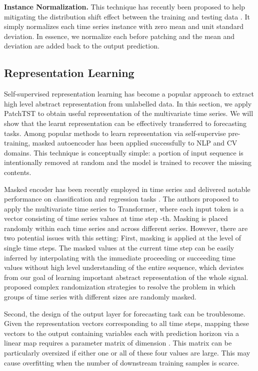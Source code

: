 \documentclass{article} \usepackage{iclr2023_conference,times}
\begin{document}
\textbf{Instance Normalization.} This technique has recently been proposed to help mitigating the distribution shift effect between the training and testing data \citep{instance,revin}. It simply normalizes each time series instance  with zero mean and unit standard deviation. In essence, we normalize each  before patching and the mean and deviation are added back to the output prediction.   

\subsection{Representation Learning}
\label{subsec::representation learning}

Self-supervised representation learning has become a popular approach to extract high level abstract representation from unlabelled data. In this section, we apply PatchTST to obtain useful representation of the multivariate time series. We will show that the learnt representation can be effectively transferred to forecasting tasks. Among popular methods to learn representation via self-supervise pre-training, masked autoencoder has been applied successfully to NLP \citep{bert} and CV \citep{mae} domains. This technique is conceptually simple: a portion of input sequence is intentionally removed at random and the model is trained to recover the missing contents. 


Masked encoder has been recently employed in time series and delivered notable performance on classification and regression tasks \citep{tst}. The authors proposed to apply the multivariate time series to Transformer, where each input token is a vector  consisting of time series values at time step -th. Masking is placed randomly within each time series and across different series. However, there are two potential issues with this setting: First, masking is applied at the level of single time steps. The masked values at the current time step can be easily inferred by interpolating with the immediate proceeding or succeeding time values without high level understanding of the entire sequence, which deviates from our goal of learning important abstract representation of the whole signal. \citet{tst} proposed complex randomization strategies to resolve the problem in which groups of time series with different sizes are randomly masked. 





Second, the design of the output layer for forecasting task can be troublesome. Given the representation vectors   corresponding to all  time steps, mapping these vectors to the output containing  variables each with prediction horizon  via a linear map requires a parameter matrix  of dimension . This matrix can be particularly oversized if either one or all of these four values are large. This may cause overfitting when the number of downstream training samples is scarce. 
\end{document}
